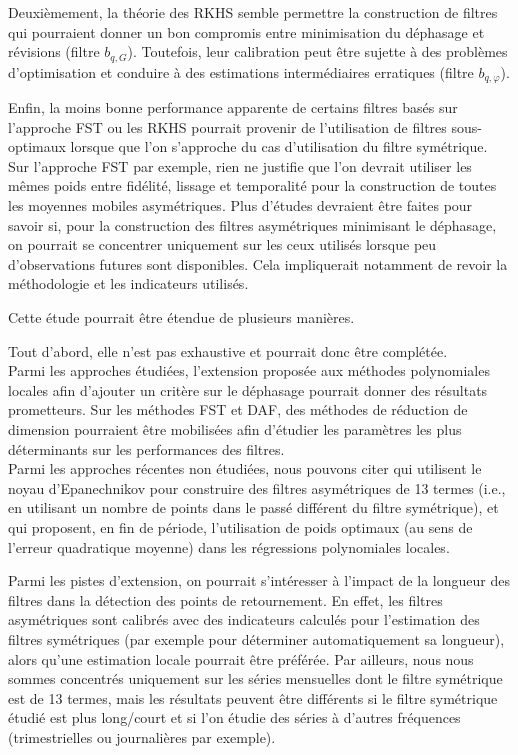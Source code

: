 \documentclass[
  12pt,
  french,
  12pt,a4paper]{article}
\newcommand\1{\mathds{1}}
\begin{document}
Deuxièmement, la théorie des RKHS semble permettre la construction de filtres qui pourraient donner un bon compromis entre minimisation du déphasage et révisions (filtre \(b_{q,G}\)).
Toutefois, leur calibration peut être sujette à des problèmes d'optimisation et conduire à des estimations intermédiaires erratiques (filtre \(b_{q,\varphi}\)).

Enfin, la moins bonne performance apparente de certains filtres basés sur l'approche FST ou les RKHS pourrait provenir de l'utilisation de filtres sous-optimaux lorsque que l'on s'approche du cas d'utilisation du filtre symétrique.
Sur l'approche FST par exemple, rien ne justifie que l'on devrait utiliser les mêmes poids entre fidélité, lissage et temporalité pour la construction de toutes les moyennes mobiles asymétriques.
Plus d'études devraient être faites pour savoir si, pour la construction des filtres asymétriques minimisant le déphasage, on pourrait se concentrer uniquement sur les ceux utilisés lorsque peu d'observations futures sont disponibles.
Cela impliquerait notamment de revoir la méthodologie et les indicateurs utilisés.

Cette étude pourrait être étendue de plusieurs manières.

Tout d'abord, elle n'est pas exhaustive et pourrait donc être complétée.\\
Parmi les approches étudiées, l'extension proposée aux méthodes polynomiales locales afin d'ajouter un critère sur le déphasage pourrait donner des résultats prometteurs.
Sur les méthodes FST et DAF, des méthodes de réduction de dimension pourraient être mobilisées afin d'étudier les paramètres les plus déterminants sur les performances des filtres.\\
Parmi les approches récentes non étudiées, nous pouvons citer \textcite{vasyechko2014new} qui utilisent le noyau d'Epanechnikov pour construire des filtres asymétriques de 13 termes (i.e., en utilisant un nombre de points dans le passé différent du filtre symétrique), et \textcite{FengSchafer2021} qui proposent, en fin de période, l'utilisation de poids optimaux (au sens de l'erreur quadratique moyenne) dans les régressions polynomiales locales.

Parmi les pistes d'extension, on pourrait s'intéresser à l'impact de la longueur des filtres dans la détection des points de retournement.
En effet, les filtres asymétriques sont calibrés avec des indicateurs calculés pour l'estimation des filtres symétriques (par exemple pour déterminer automatiquement sa longueur), alors qu'une estimation locale pourrait être préférée.
Par ailleurs, nous nous sommes concentrés uniquement sur les séries mensuelles dont le filtre symétrique est de 13 termes, mais les résultats peuvent être différents si le filtre symétrique étudié est plus long/court et si l'on étudie des séries à d'autres fréquences (trimestrielles ou journalières par exemple).
\end{document}
